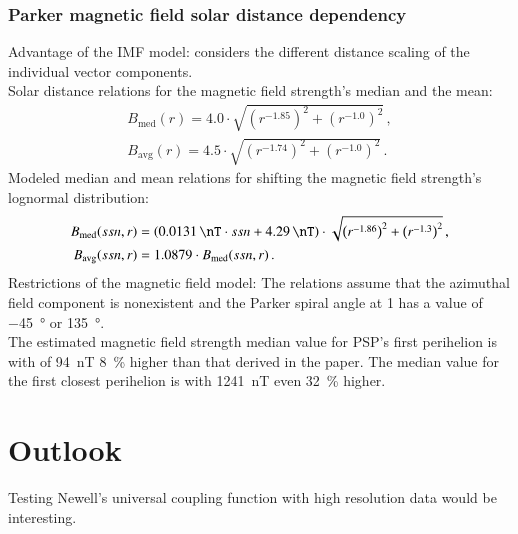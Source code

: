 \subsubsection*{Parker magnetic field solar distance dependency}
Advantage of the IMF model: considers the different distance scaling of the individual vector components.\\

Solar distance relations for the magnetic field strength's median and the mean:
\begin{align}
	B_\text{med}(r) = 4.0 \cdot \sqrt{\left(r^{-1.85}\right)^2 + \left(r^{-1.0}\right)^2}	\,,\\
	B_\text{avg}(r) = 4.5 \cdot \sqrt{\left(r^{-1.74}\right)^2 + \left(r^{-1.0}\right)^2}	\,.
\end{align}
Modeled median and mean relations for shifting the magnetic field strength's lognormal distribution:
\begin{align}
	B_\text{med}(ssn,r) &= \left(\SI{0.0131}{\nT} \cdot ssn + \SI{4.29}{\nT}\right) \cdot \sqrt{\left(r^{-1.86}\right)^2 + \left(r^{-1.3}\right)^2}	\,,\\
	B_\text{avg}(ssn,r) &= 1.0879 \cdot B_\text{med}(ssn,r)	\,.
\end{align}
Restrictions of the magnetic field model: The relations assume that the azimuthal field component is nonexistent and the Parker spiral angle at \SI{1}{\au} has a value of \SI{-45}{\degree} or \SI{135}{\degree}.\\

The estimated magnetic field strength median value for PSP's first perihelion is with of \SI{94}{\nano\tesla} \SI{8}{\%} higher than that derived in the paper. The median value for the first closest perihelion is with \SI{1241}{\nano\tesla} even \SI{32}{\%} higher.\\


\section{Outlook}




Testing Newell's universal coupling function with high resolution data would be interesting.\\

